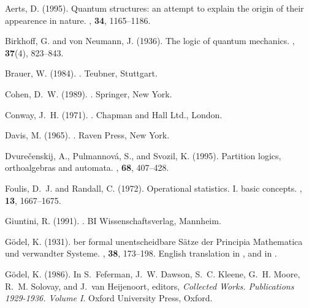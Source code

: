 \begin{thebibliography}{}

Aerts, D. (1995).
\newblock Quantum structures: an attempt to explain the origin of their
  appearence in nature.
, {\bf 34},
  1165--1186.

Birkhoff, G. and von Neumann, J. (1936).
\newblock The logic of quantum mechanics.
, {\bf 37}(4), 823--843.

Brauer, W. (1984).
.
\newblock Teubner, Stuttgart.

Cohen, D.~W. (1989).
.
\newblock Springer, New York.

Conway, J.~H. (1971).
.
\newblock Chapman and Hall Ltd., London.

Davis, M. (1965).
.
\newblock Raven Press, New York.

Dvure{\v{c}}enskij, A., Pulmannov{\'{a}}, S., and Svozil, K. (1995).
\newblock Partition logics, orthoalgebras and automata.
, {\bf 68}, 407--428.

Foulis, D.~J. and Randall, C. (1972).
\newblock Operational statistics. {I}. basic concepts.
, {\bf 13}, 1667--1675.

Giuntini, R. (1991).
.
\newblock BI Wissenschaftsverlag, Mannheim.

G{\"{o}}del, K. (1931).
ber formal unentscheidbare {S\"{a}}tze der {P}rincipia
  {M}athematica und verwandter {S}ysteme.
, {\bf 38},
  173--198.
\newblock English translation in \cite{godel-ges1}, and in \cite{davis}.

G{\"{o}}del, K. (1986).
\newblock In S.~Feferman, J.~W. Dawson, S.~C. Kleene, G.~H. Moore, R.~M.
  Solovay, and J.~van Heijenoort, editors, {\em Collected Works. Publications
  1929-1936. Volume {I}}. Oxford University Press, Oxford.


\end{thebibliography}
